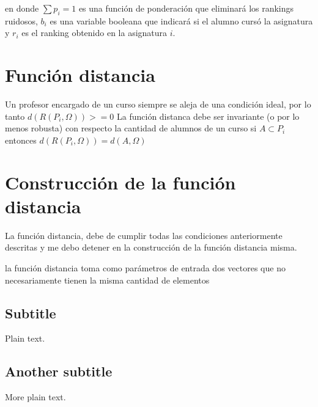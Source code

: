\documentclass{article}
\begin{document}
en donde $\sum p_i = 1$ es una función de ponderación que eliminará los rankings
ruidosos, $b_i$ es una variable booleana que indicará si el alumno cursó la
asignatura y $r_i$ es el ranking obtenido en la asignatura $i$.

\section{Función distancia}
Un profesor encargado de un curso siempre se aleja de una condición ideal, por
lo tanto
$d(R(P_i,\Omega))>=0$
La función distanca debe ser invariante (o por lo menos robusta) con respecto
la cantidad de alumnos de un curso
 si $A\subset P_i$ entonces $d(R(P_i,\Omega)) = d(A,\Omega)$

 
 \section{Construcción de la función distancia}
 La función distancia, debe de cumplir todas las condiciones anteriormente
 descritas y me debo detener en la construcción de la función distancia misma.
 
 la función distancia toma como parámetros de entrada dos vectores que no
 necesariamente tienen la misma cantidad de elementos
 


\subsection{Subtitle}

Plain text.

\subsection{Another subtitle}

More plain text.
\end{document}
